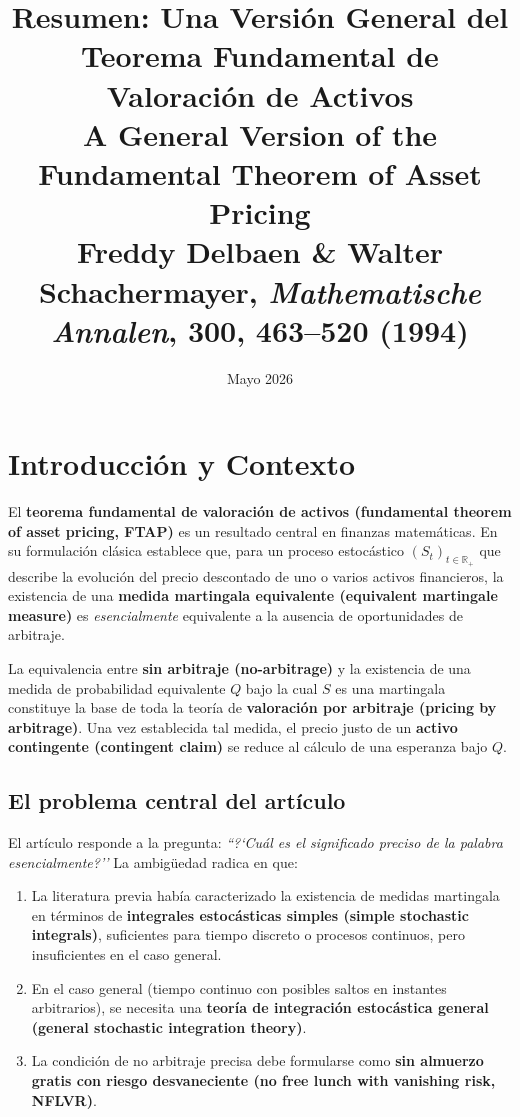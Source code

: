 \documentclass[12pt]{article}
\title{\textbf{Resumen: Una Versi\'on General del Teorema Fundamental de Valoraci\'on de Activos}\\
\large A General Version of the Fundamental Theorem of Asset Pricing\\
\normalsize Freddy Delbaen \& Walter Schachermayer, \textit{Mathematische Annalen}, 300, 463--520 (1994)}
\author{}
\date{Mayo 2026}
\begin{document}
\maketitle
\tableofcontents
\newpage

\section{Introducci\'on y Contexto}

El \textbf{teorema fundamental de valoraci\'on de activos (fundamental theorem of asset pricing, FTAP)} es un resultado central en finanzas matem\'aticas. En su formulaci\'on cl\'asica establece que, para un proceso estoc\'astico $(S_t)_{t \in \mathbb{R}_+}$ que describe la evoluci\'on del precio descontado de uno o varios activos financieros, la existencia de una \textbf{medida martingala equivalente (equivalent martingale measure)} es \emph{esencialmente} equivalente a la ausencia de oportunidades de arbitraje.

La equivalencia entre \textbf{sin arbitraje (no-arbitrage)} y la existencia de una medida de probabilidad equivalente $Q$ bajo la cual $S$ es una martingala constituye la base de toda la teor\'ia de \textbf{valoraci\'on por arbitraje (pricing by arbitrage)}. Una vez establecida tal medida, el precio justo de un \textbf{activo contingente (contingent claim)} se reduce al c\'alculo de una esperanza bajo $Q$.

\subsection{El problema central del art\'iculo}

El art\'iculo responde a la pregunta: \emph{``?`Cu\'al es el significado preciso de la palabra esencialmente?''} La ambig\"uedad radica en que:

\begin{enumerate}
    \item La literatura previa hab\'ia caracterizado la existencia de medidas martingala en t\'erminos de \textbf{integrales estoc\'asticas simples (simple stochastic integrals)}, suficientes para tiempo discreto o procesos continuos, pero insuficientes en el caso general.
    \item En el caso general (tiempo continuo con posibles saltos en instantes arbitrarios), se necesita una \textbf{teor\'ia de integraci\'on estoc\'astica general (general stochastic integration theory)}.
    \item La condici\'on de no arbitraje precisa debe formularse como \textbf{sin almuerzo gratis con riesgo desvaneciente (no free lunch with vanishing risk, NFLVR)}.
\end{enumerate}
\end{document}
